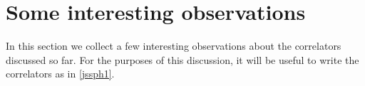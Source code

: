 \documentclass[a4paper,11pt]{article}
\begin{document}


\section{Some interesting observations}\label{sio}
In this section we collect a few interesting observations about the correlators discussed so far. For the purposes of this discussion, it will be useful to write the correlators as in \eqref{jssph1}.
\end{document}
